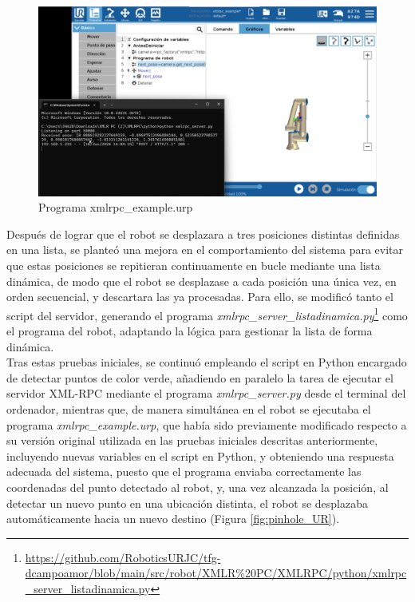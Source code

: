   \begin{figure}[H]
     \centering
     \begin{center}
       \includegraphics[width=130mm]{figs/xmlrpc_example.png}
     \end{center}
     \caption{Programa xmlrpc\_example.urp}
     \label{fig:prueba_xmlrpc}
  \end{figure}

Después de lograr que el robot se desplazara a tres posiciones distintas definidas en una lista, se planteó una mejora en el comportamiento del sistema para evitar que estas posiciones se repitieran continuamente en bucle mediante una lista dinámica, de modo que el robot se desplazase a cada posición una única vez, en orden secuencial, y descartara las ya procesadas. Para ello, se modificó tanto el script del servidor, generando el programa \textit{xmlrpc\_server\_listadinamica.py}\footnote{\url{https://github.com/RoboticsURJC/tfg-dcampoamor/blob/main/src/robot/XMLR\%20PC/XMLRPC/python/xmlrpc_server_listadinamica.py}} como el programa del robot, adaptando la lógica para gestionar la lista de forma dinámica.\\

Tras estas pruebas iniciales, se continuó empleando el script en Python encargado de detectar puntos de color verde, añadiendo en paralelo la tarea de ejecutar el servidor XML-RPC mediante el programa \textit{xmlrpc\_server.py} desde el terminal del ordenador, mientras que, de manera simultánea en el robot se ejecutaba el programa \textit{xmlrpc\_example.urp}, que había sido previamente modificado respecto a su versión original utilizada en las pruebas iniciales descritas anteriormente, incluyendo nuevas variables en el script en Python, y obteniendo una respuesta adecuada del sistema, puesto que el programa enviaba correctamente las coordenadas del punto detectado al robot, y, una vez alcanzada la posición, al detectar un nuevo punto en una ubicación distinta, el robot se desplazaba automáticamente hacia un nuevo destino (Figura \ref{fig:pinhole_UR}). 

